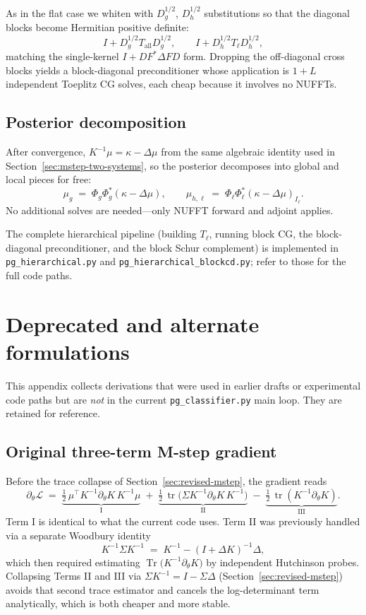 \documentclass{article}
\DeclareMathOperator{\tr}{tr}
\DeclareMathOperator{\Tr}{Tr}
\begin{document}
As in the flat case we whiten with $D_g^{1/2}$, $D_h^{1/2}$ substitutions so that the diagonal blocks become Hermitian positive definite:
\[
  I + D_g^{1/2}T_{\text{all}}D_g^{1/2},
  \qquad
  I + D_h^{1/2}T_\ell D_h^{1/2},
\]
matching the single-kernel $I+DF^{*}\Delta FD$ form. Dropping the off-diagonal cross blocks yields a block-diagonal preconditioner whose application is $1+L$ independent Toeplitz CG solves, each cheap because it involves no NUFFTs.

\subsection{Posterior decomposition}
After convergence, $K^{-1}\mu=\kappa-\Delta\mu$ from the same algebraic identity used in Section~\ref{sec:mstep-two-systems}, so the posterior decomposes into global and local pieces for free:
\[
  \mu_g \;=\; \Phi_g\Phi_g^{*}(\kappa-\Delta\mu),
  \qquad
  \mu_{h,\ell} \;=\; \Phi_\ell\Phi_\ell^{*}(\kappa-\Delta\mu)_{I_\ell}.
\]
No additional solves are needed---only NUFFT forward and adjoint applies.

The complete hierarchical pipeline (building $T_\ell$, running block CG, the block-diagonal preconditioner, and the block Schur complement) is implemented in \texttt{pg\_hierarchical.py} and \texttt{pg\_hierarchical\_blockcd.py}; refer to those for the full code paths.

\appendix

\section{Deprecated and alternate formulations}
\label{app:deprecated}

This appendix collects derivations that were used in earlier drafts or experimental code paths but are \emph{not} in the current \texttt{pg\_classifier.py} main loop. They are retained for reference.

\subsection{Original three-term M-step gradient}
\label{app:three-term}
Before the trace collapse of Section~\ref{sec:revised-mstep}, the gradient reads
\[
  \partial_\theta\mathcal{L}
  \;=\;
  \underbrace{\tfrac12\,\mu^{\top}K^{-1}\partial_\theta K\,K^{-1}\mu}_{\text{I}}
  \;+\;
  \underbrace{\tfrac12\,\tr\!\bigl(\Sigma K^{-1}\partial_\theta K\,K^{-1}\bigr)}_{\text{II}}
  \;-\;
  \underbrace{\tfrac12\,\tr(K^{-1}\partial_\theta K)}_{\text{III}}.
\]
Term I is identical to what the current code uses. Term II was previously handled via a separate Woodbury identity
\[
  K^{-1}\Sigma K^{-1} \;=\; K^{-1} - (I+\Delta K)^{-1}\Delta,
\]
which then required estimating $\Tr\!\bigl(K^{-1}\partial_\theta K\bigr)$ by independent Hutchinson probes. Collapsing Terms II and III via $\Sigma K^{-1}=I-\Sigma\Delta$ (Section~\ref{sec:revised-mstep}) avoids that second trace estimator and cancels the log-determinant term analytically, which is both cheaper and more stable.
\end{document}
